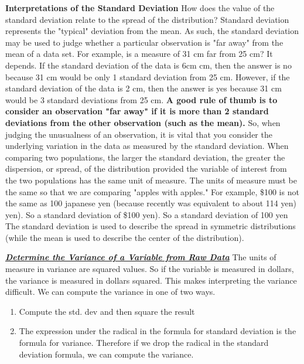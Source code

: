 \documentclass{report}
\begin{document}
        \bigbreak \noindent \bigbreak \noindent 
        \textbf{Interpretations of the Standard Deviation}
        \bigbreak \noindent 
        How does the value of the standard deviation relate to the spread of the distribution?
        \bigbreak \noindent 
        Standard deviation represents the "typical" deviation from the mean. As such, the standard deviation may be used to judge whether a particular observation is "far away" from the mean of a data set. For example, is a measure of 31  cm far from 25 cm? It depends. If the standard deviation of the data is 6cm  cm, then the answer is no because 31  cm would be only 1  standard deviation from 25  cm. However, if the standard deviation of the data is 2  cm, then the answer is yes because 31 cm would be 3  standard deviations from 25  cm. \textbf{A good rule of thumb is to consider an observation "far away" if it is more than 2  standard deviations from the other observation (such as the mean).}
        \bigbreak \noindent
        So, when judging the unusualness of an observation, it is vital that you consider the underlying variation in the data as measured by the standard deviation.
        \bigbreak \noindent 
        When comparing two populations, the larger the standard deviation, the greater the dispersion, or spread, of the distribution provided the variable of interest from the two populations has the same unit of measure. The units of measure must be the same so that we are comparing "apples with apples." For example, \$100 is not the same as 100 japanese yen (because recently  was equivalent to about 114 yen)  yen). So a standard deviation of \$100  yen). So a standard deviation of 100 yen
        \bigbreak \noindent 
        The standard deviation is used to describe the spread in symmetric distributions (while the mean is used to describe the center of the distribution).

        \bigbreak \noindent 

        \bigbreak \noindent \bigbreak \noindent 
        \textbf{\textit{\underline{Determine the Variance of a Variable from Raw Data}}}
        \bigbreak \noindent 
        The units of measure in variance are squared values. So if the variable is measured in dollars, the variance is measured in dollars squared. This makes interpreting the variance difficult.
        \bigbreak \noindent 
        We can compute the variance in one of two ways.
        \begin{enumerate}
            \item Compute the std. dev and then square the result
            \item The expression under the radical in the formula for standard deviation is the formula for variance. Therefore if we drop the radical in the standard deviation formula, we can compute the variance.
        \end{enumerate}
        \bigbreak \noindent 
\end{document}

